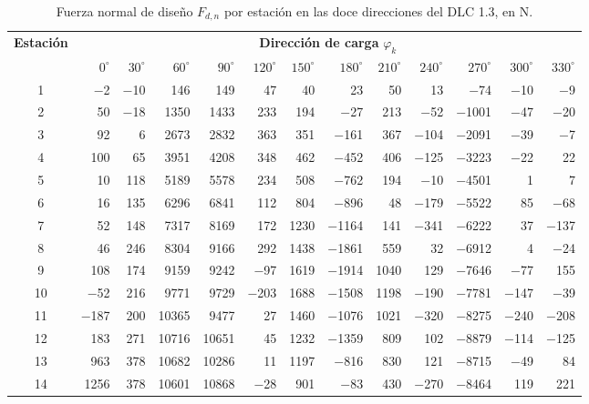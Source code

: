 \begin{table}[H]
    \centering
    \footnotesize
    \setlength{\tabcolsep}{3.2pt}
    \caption{Fuerza normal de diseño $F_{d,n}$ por estación en las doce direcciones del DLC 1.3, en N.}
    \label{tab:anexo_dir_dlc13_n}
    \begin{tabular}{crrrrrrrrrrrr}
        \hline
        \textbf{Estación} & \multicolumn{12}{c}{\textbf{Dirección de carga} $\varphi_k$} \\
        \cline{2-13}
        & $0^\circ$ & $30^\circ$ & $60^\circ$ & $90^\circ$ & $120^\circ$ & $150^\circ$ & $180^\circ$ & $210^\circ$ & $240^\circ$ & $270^\circ$ & $300^\circ$ & $330^\circ$ \\
        \hline
        1 & $-$2 & $-$10 & 146 & 149 & 47 & 40 & 23 & 50 & 13 & $-$74 & $-$10 & $-$9 \\
        2 & 50 & $-$18 & 1350 & 1433 & 233 & 194 & $-$27 & 213 & $-$52 & $-$1001 & $-$47 & $-$20 \\
        3 & 92 & 6 & 2673 & 2832 & 363 & 351 & $-$161 & 367 & $-$104 & $-$2091 & $-$39 & $-$7 \\
        4 & 100 & 65 & 3951 & 4208 & 348 & 462 & $-$452 & 406 & $-$125 & $-$3223 & $-$22 & 22 \\
        5 & 10 & 118 & 5189 & 5578 & 234 & 508 & $-$762 & 194 & $-$10 & $-$4501 & 1 & 7 \\
        6 & 16 & 135 & 6296 & 6841 & 112 & 804 & $-$896 & 48 & $-$179 & $-$5522 & 85 & $-$68 \\
        7 & 52 & 148 & 7317 & 8169 & 172 & 1230 & $-$1164 & 141 & $-$341 & $-$6222 & 37 & $-$137 \\
        8 & 46 & 246 & 8304 & 9166 & 292 & 1438 & $-$1861 & 559 & 32 & $-$6912 & 4 & $-$24 \\
        9 & 108 & 174 & 9159 & 9242 & $-$97 & 1619 & $-$1914 & 1040 & 129 & $-$7646 & $-$77 & 155 \\
        10 & $-$52 & 216 & 9771 & 9729 & $-$203 & 1688 & $-$1508 & 1198 & $-$190 & $-$7781 & $-$147 & $-$39 \\
        11 & $-$187 & 200 & 10365 & 9477 & 27 & 1460 & $-$1076 & 1021 & $-$320 & $-$8275 & $-$240 & $-$208 \\
        12 & 183 & 271 & 10716 & 10651 & 45 & 1232 & $-$1359 & 809 & 102 & $-$8879 & $-$114 & $-$125 \\
        13 & 963 & 378 & 10682 & 10286 & 11 & 1197 & $-$816 & 830 & 121 & $-$8715 & $-$49 & 84 \\
        14 & 1256 & 378 & 10601 & 10868 & $-$28 & 901 & $-$83 & 430 & $-$270 & $-$8464 & 119 & 221 \\

\end{tabular}
\end{table}
